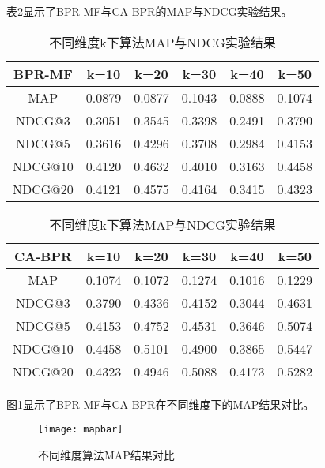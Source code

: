 表\ref{tab:mapandndcg}显示了BPR-MF与CA-BPR的MAP与NDCG实验结果。
\begin{table}[htbp]
	\caption{不同维度k下算法MAP与NDCG实验结果}
	\label{tab:mapandndcg}
	\begin{center}
		\begin{tabular}{|c | c |c |c|c|c|}
			\hline
			BPR-MF  &   k=10 &   k=20 &    k=30&    k=40&    k=50\\
			\hline
			MAP      &  0.0879&  0.0877&  0.1043&  0.0888&  0.1074\\
			\hline
			NDCG@3   &  0.3051&  0.3545&  0.3398&  0.2491&  0.3790\\
			NDCG@5   &  0.3616&  0.4296&  0.3708&  0.2984&  0.4153\\
			NDCG@10  &  0.4120&  0.4632&  0.4010&  0.3163&  0.4458\\
			NDCG@20  &  0.4121&  0.4575&  0.4164&  0.3415&  0.4323\\
			\hline
		\end{tabular}
		
		\begin{tabular}{|c | c |c |c|c|c|}
			\hline
			CA-BPR  &     k=10&   k=20 &    k=30&  k=40 &   k=50\\
			\hline
			MAP     &   0.1074&  0.1072&  0.1274&  0.1016&  0.1229\\
			\hline
			NDCG@3  &   0.3790&  0.4336&  0.4152&  0.3044&  0.4631\\
			NDCG@5  &   0.4153&  0.4752&  0.4531&  0.3646&  0.5074\\
			NDCG@10 &   0.4458&  0.5101&  0.4900&  0.3865&  0.5447\\
			NDCG@20 &   0.4323&  0.4946&  0.5088&  0.4173&  0.5282\\
			\hline
		\end{tabular}
	\end{center}
\end{table}

图\ref{fig:map}显示了BPR-MF与CA-BPR在不同维度下的MAP结果对比。
\begin{figure}[htbp]
	\begin{center}
	\texttt{[image: mapbar]}
\end{center}
\caption{不同维度算法MAP结果对比}
\label{fig:map}
\end{figure}

